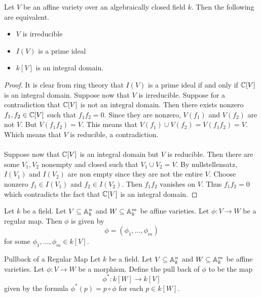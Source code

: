 \documentclass[a4paper]{article}
\begin{document}
\begin{prp}{}{} Let $V$ be an affine variety over an algebraically closed field $k$. Then the following are equivalent. 
\begin{itemize}
\item $V$ is irreducible
\item $I(V)$ is a prime ideal
\item $k[V]$ is an integral domain. 
\end{itemize}\tcbline
\begin{proof}
It is clear from ring theory that $I(V)$ is a prime ideal if and only if $\mathbb{C}[V]$ is an integral domain. Suppose now that $V$ is irreducible. Suppose for a contradiction that $\mathbb{C}[V]$ is not an integral domain. Then there exists nonzero $f_1,f_2\in\mathbb{C}[V]$ such that $f_1f_2=0$. Since they are nonzero, $V(f_1)$ and $V(f_2)$ are not $V$. But $V(f_1f_2)=V$. This means that $V(f_1)\cup V(f_2)=V(f_1f_2)=V$. Which means that $V$ is reducible, a contradiction. \\~\\
Suppose now that $\mathbb{C}[V]$ is an integral domain but $V$ is reducible. Then there are some $V_1,V_2$ nonempty and closed such that $V_1\cup V_2=V$. By nullstellensatz, $I(V_1)$ and $I(V_2)$ are non empty since they are not the entire $V$. Choose nonzero $f_1\in I(V_1)$ and $f_2\in I(V_2)$. Then $f_1f_2$ vanishes on $V$. Thus $f_1f_2=0$ which contradicts the fact that $\mathbb{C}[V]$ is an integral domain. 
\end{proof}
\end{prp}

\begin{prp}{}{} Let $k$ be a field. Let $V\subseteq\mathbb{A}_k^n$ and $W\subseteq\mathbb{A}_k^m$ be affine varieties. Let $\phi:V\to W$ be a regular map. Then $\phi$ is given by $$\phi=(\phi_1,\dots,\phi_m)$$ for some $\phi_1,\dots,\phi_m\in k[V]$. 
\end{prp}

\begin{defn}{Pullback of a Regular Map}{} Let $k$ be a field. Let $V\subseteq\mathbb{A}_k^n$ and $W\subseteq\mathbb{A}_k^m$ be affine varieties. Let $\phi:V\to W$ be a morphism. Define the pull back of $\phi$ to be the map $$\phi^\ast:k[W]\to k[V]$$ given by the formula $\phi^\ast(p)=p\circ\phi$ for each $p\in k[W]$. 
\end{defn}
\end{document}
